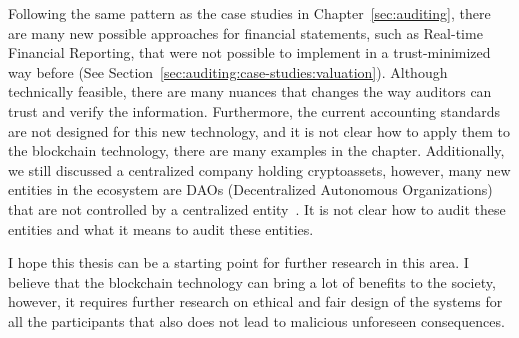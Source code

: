 Following the same pattern as the case studies in Chapter~\ref{sec:auditing}, there are many new possible approaches for financial statements, such as Real-time Financial Reporting, that were not possible to implement in a trust-minimized way before (See Section~\ref{sec:auditing:case-studies:valuation}). Although technically feasible, there are many nuances that changes the way auditors can trust and verify the information. Furthermore, the current accounting standards are not designed for this new technology, and it is not clear how to apply them to the blockchain technology, there are many examples in the chapter. Additionally, we still discussed a centralized company holding cryptoassets, however, many new entities in the ecosystem are DAOs (Decentralized Autonomous Organizations) that are not controlled by a centralized entity~\cite{tan2023open}. It is not clear how to audit these entities and what it means to audit these entities.

I hope this thesis can be a starting point for further research in this area. I believe that the blockchain technology can bring a lot of benefits to the society, however, it requires further research on ethical and fair design of the systems for all the participants that also does not lead to malicious unforeseen consequences.



